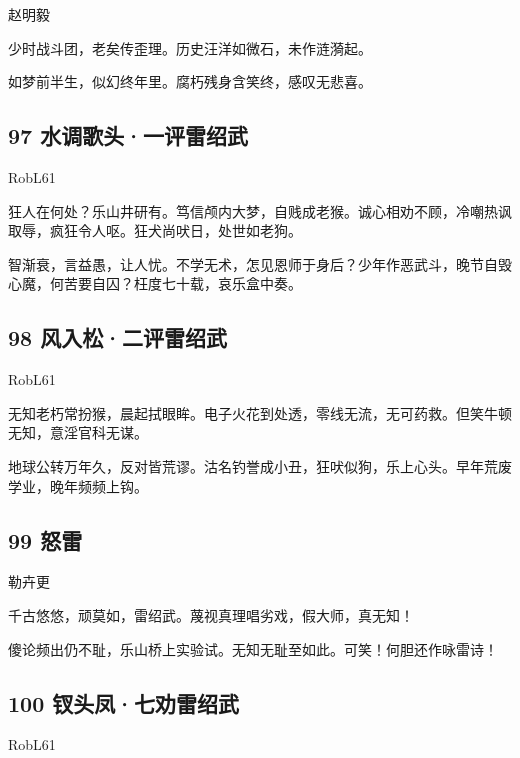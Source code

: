 {赵明毅}

少时战斗团，老矣传歪理。历史汪洋如微石，未作涟漪起。

如梦前半生，似幻终年里。腐朽残身含笑终，感叹无悲喜。

\hypertarget{ux6c34ux8c03ux6b4cux5934ux4e00ux8bc4ux96f7ux7ecdux6b66}{%
\subsection{\texorpdfstring{97 水调歌头·一评雷绍武
}{97 水调歌头·一评雷绍武 }}\label{ux6c34ux8c03ux6b4cux5934ux4e00ux8bc4ux96f7ux7ecdux6b66}}

{RobL61}

狂人在何处？乐山井研有。笃信颅内大梦，自贱成老猴。诚心相劝不顾，冷嘲热讽取辱，疯狂令人呕。狂犬尚吠日，处世如老狗。

智渐衰，言益愚，让人忧。不学无术，怎见恩师于身后？少年作恶武斗，晚节自毁心魔，何苦要自囚？枉度七十载，哀乐盒中奏。

\hypertarget{ux98ceux5165ux677eux4e8cux8bc4ux96f7ux7ecdux6b66}{%
\subsection{98
风入松·二评雷绍武}\label{ux98ceux5165ux677eux4e8cux8bc4ux96f7ux7ecdux6b66}}

{RobL61}

无知老朽常扮猴，晨起拭眼眸。电子火花到处透，零线无流，无可药救。但笑牛顿无知，意淫官科无谋。

地球公转万年久，反对皆荒谬。沽名钓誉成小丑，狂吠似狗，乐上心头。早年荒废学业，晚年频频上钩。

\hypertarget{ux6012ux96f7}{%
\subsection{99 怒雷}\label{ux6012ux96f7}}

{勒卉更 }

千古悠悠，顽莫如，雷绍武。蔑视真理唱劣戏，假大师，真无知！

傻论频出仍不耻，乐山桥上实验试。无知无耻至如此。可笑！何胆还作咏雷诗！

\hypertarget{ux9497ux5934ux51e4ux4e03ux529dux96f7ux7ecdux6b66}{%
\subsection{100
钗头凤·七劝雷绍武}\label{ux9497ux5934ux51e4ux4e03ux529dux96f7ux7ecdux6b66}}

{RobL61}


